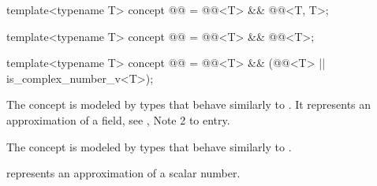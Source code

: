 \begin{itemdecl}
template<typename T>
concept @@ = @@<T> && @@<T, T>;

template<typename T>
concept @@ = @@<T> && @@<T>;

template<typename T>
concept @@ = @@<T> && (@@<T> || is_complex_number_v<T>);
\end{itemdecl}

\begin{itemdescr}
\pnum
\begin{note}
The  concept is modeled by types
that behave similarly to .
It represents an approximation of a field, see , Note 2 to entry.
\end{note}

\pnum
\begin{note}
The  concept is modeled by types
that behave similarly to .
\end{note}

\pnum
\begin{note}
 represents an approximation of a scalar number.
\end{note}
\end{itemdescr}
